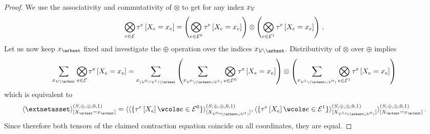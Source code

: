 \documentclass[aps,onecolumn,nofootinbib,pra]{article}
\newcommand{\gensemiring}{(S,\srplus,\srmul,0,1)}
\newcommand{\srcontractionofwrt}[3]{\langle#1\rangle^{#3}_{[#2]}}
\newcommand{\srplus}{\oplus}
\newcommand{\srmul}{\otimes} %
\begin{document}
    \begin{proof}
        We use the associativity and commutativity of $\srmul$ to get for any index $x_{\mathcal{V}}$
        \begin{align*}
            \bigotimes_{\edgein}\hypercoreofat{\edge}{\indexedcatvariableof{\edge}}
            = \left(\bigotimes_{\edge\in\edgesof{0}}\hypercoreofat{\edge}{\indexedcatvariableof{\edge}}\right)
            \srmul \left(\bigotimes_{\edge\in\edgesof{1}}\hypercoreofat{\edge}{\indexedcatvariableof{\edge}}\right) \, .
        \end{align*}
        Let us now keep $\catindexof{\arbset}$ fixed and investigate the $\srplus$ operation over the indices $\catindexof{\nodes\backslash\arbset}$.
        Distributivity of $\srmul$ over $\srplus$ implies
        \begin{align*}
            \sum_{\catindexof{\nodes\backslash\arbset}} \bigotimes_{\edgein}\hypercoreofat{\edge}{\indexedcatvariableof{\edge}}
            = \sum_{\catindexof{(\nodesof{0}\cap\nodesof{1})\backslash \arbset}}
            \left(
                \sum_{\catindexof{\nodesof{0}\backslash(\arbset\cup\nodesof{1})}}\bigotimes_{\edge\in\edgesof{0}}\hypercoreofat{\edge}{\indexedcatvariableof{\edge}}
            \right) \srmul
            \left(
                \sum_{\catindexof{\nodesof{1}\backslash(\arbset\cup\nodesof{0})}}\bigotimes_{\edge\in\edgesof{1}}\hypercoreofat{\edge}{\indexedcatvariableof{\edge}}
            \right)
        \end{align*}
        which is equivalent to
        \begin{align*}
            \srcontractionofwrt{
                \extnetasset
            }{\indexedcatvariableof{\arbset}}{\gensemiring}
            =
            \srcontractionofwrt{
                \srcontractionofwrt{
                    \{\hypercoreofat{\edge}{\catvariableof{\edge}} \wcols \edge\in\edgesof{0}\}
                }{\catvariableof{\nodesof{0}\cap(\arbset\cup\nodesof{1})}}{\gensemiring},
                \srcontractionofwrt{
                    \{\hypercoreofat{\edge}{\catvariableof{\edge}} \wcols \edge\in\edgesof{1}\}
                }{\catvariableof{\nodesof{1}\cap(\arbset\cup\nodesof{0})}}{\gensemiring}
            }{\indexedcatvariableof{\arbset}}{\gensemiring} \, .
        \end{align*}
        Since therefore both tensors of the claimed contraction equation coincide on all coordinates, they are equal.
    \end{proof}
\end{document}
